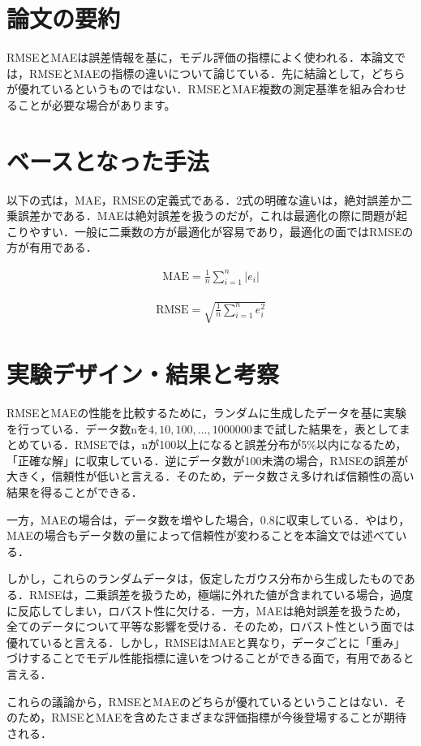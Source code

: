 \documentclass[10pt,onecolumn]{jsarticle}
\begin{document}
\section{論文の要約}
RMSEとMAEは誤差情報を基に，モデル評価の指標によく使われる．本論文では，RMSEとMAEの指標の違いについて論じている．先に結論として，どちらが優れているというものではない．RMSEとMAE複数の測定基準を組み合わせることが必要な場合があります。

\section{ベースとなった手法}
以下の式は，MAE，RMSEの定義式である．2式の明確な違いは，絶対誤差か二乗誤差かである．MAEは絶対誤差を扱うのだが，これは最適化の際に問題が起こりやすい．一般に二乗数の方が最適化が容易であり，最適化の面ではRMSEの方が有用である．

\begin{align}
	\mathrm{MAE}=\frac{1}{n} \sum_{i=1}^{n}\left|e_{i}\right|
\end{align}

\begin{align}
	\mathrm{RMSE}=\sqrt{\frac{1}{n} \sum_{i=1}^{n} e_{i}^{2}}
\end{align}
\section{実験デザイン・結果と考察}
RMSEとMAEの性能を比較するために，ランダムに生成したデータを基に実験を行っている．データ数nを$4,10,100,...,1000000$まで試した結果を，表としてまとめている．RMSEでは，nが100以上になると誤差分布が5\%以内になるため，「正確な解」に収束している．逆にデータ数が100未満の場合，RMSEの誤差が大きく，信頼性が低いと言える．そのため，データ数さえ多ければ信頼性の高い結果を得ることができる．

一方，MAEの場合は，データ数を増やした場合，0.8に収束している．やはり，MAEの場合もデータ数の量によって信頼性が変わることを本論文では述べている．

しかし，これらのランダムデータは，仮定したガウス分布から生成したものである．RMSEは，二乗誤差を扱うため，極端に外れた値が含まれている場合，過度に反応してしまい，ロバスト性に欠ける．一方，MAEは絶対誤差を扱うため，全てのデータについて平等な影響を受ける．そのため，ロバスト性という面では優れていると言える．しかし，RMSEはMAEと異なり，データごとに「重み」づけすることでモデル性能指標に違いをつけることができる面で，有用であると言える．

これらの議論から，RMSEとMAEのどちらが優れているということはない．そのため，RMSEとMAEを含めたさまざまな評価指標が今後登場することが期待される．




\end{document}
